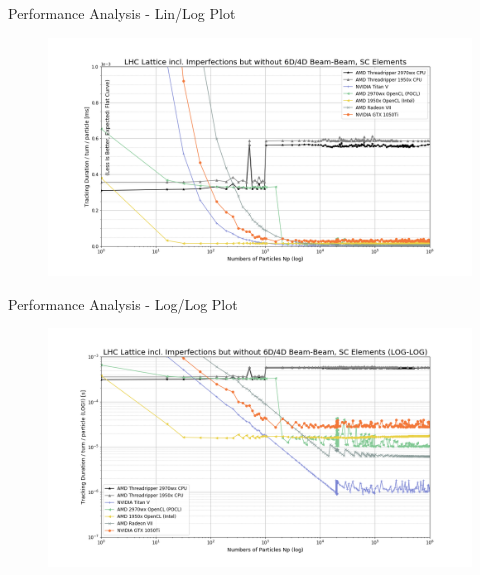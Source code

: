 \documentclass{beamer}
\begin{document}
\begin{frame}{Performance Analysis - Lin/Log Plot}
\begin{figure}[h]
    \centering 
    \includegraphics[width=1.1\textwidth]{images/performance_analysis_02.png}
\end{figure}
\end{frame}

\begin{frame}{Performance Analysis - Log/Log Plot}
\begin{figure}[h]
    \centering 
    \includegraphics[width=1.1\textwidth]{images/performance_analysis_03.png}
\end{figure}
\end{frame}




\end{document}
